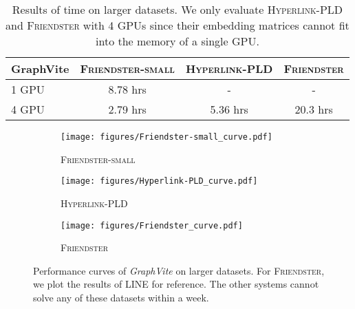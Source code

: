 \documentclass[sigconf]{acmart}
\newcommand{\dataset}[1]{\textsc{#1}\xspace}
\newcommand{\Graphy}{\textit{GraphVite}\xspace}
\begin{document}
\begin{table}[!h]
    \centering
    \begin{adjustbox}{max width=0.48\textwidth}
        \begin{tabular}{lccc}
            \toprule
            GraphVite   & \dataset{Friendster-small}    & \dataset{Hyperlink-PLD}   & \dataset{Friendster}  \\
            \midrule
            1 GPU       & 8.78 hrs                      & -                         & -                     \\
            4 GPU       & 2.79 hrs                      & 5.36 hrs                  & 20.3 hrs              \\
            \bottomrule
        \end{tabular}
    \end{adjustbox}
    \caption{Results of time on larger datasets. We only evaluate \dataset{Hyperlink-PLD} and \dataset{Friendster} with 4 GPUs since their embedding matrices cannot fit into the memory of a single GPU.}
    \label{tab:time_all}
\end{table}

\begin{figure*}
    \centering
    \begin{subfigure}{0.26\textwidth}
        \texttt{[image: figures/Friendster-small\_curve.pdf]}
        \caption{\dataset{Friendster-small}}
    \end{subfigure}
    \begin{subfigure}{0.26\textwidth}
        \texttt{[image: figures/Hyperlink-PLD\_curve.pdf]}
        \caption{\dataset{Hyperlink-PLD}}
    \end{subfigure}
    \begin{subfigure}{0.26\textwidth}
        \texttt{[image: figures/Friendster\_curve.pdf]}
        \caption{\dataset{Friendster}}
    \end{subfigure}
    \caption{Performance curves of \Graphy on larger datasets. For \dataset{Friendster}, we plot the results of LINE for reference. The other systems cannot solve any of these datasets within a week.}
    \label{fig:curves}
\end{figure*}
\end{document}
